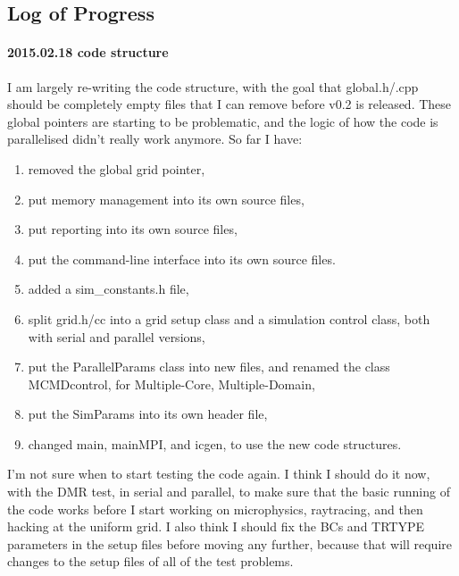 \documentclass[a4paper,11pt]{article}
\begin{document}
\subsection{Log of Progress}

\paragraph{2015.02.18 code structure}
I am largely re-writing the code structure, with the goal that global.h/.cpp should be completely empty files that I can remove before v0.2 is released.
These global pointers are starting to be problematic, and the logic of how the code is parallelised didn't really work anymore.
So far I have:
\begin{enumerate}
\item removed the global grid pointer,
\item put memory management into its own source files, 
\item put reporting into its own source files,
\item put the command-line interface into its own source files.
\item added a sim\_constants.h file,
\item split grid.h/cc into a grid setup class and a simulation control class, both with serial and parallel versions,
\item put the ParallelParams class into new files, and renamed the class MCMDcontrol, for Multiple-Core, Multiple-Domain,
\item put the SimParams into its own header file,
\item changed main, mainMPI, and icgen, to use the new code structures.
\end{enumerate}

I'm not sure when to start testing the code again.
I think I should do it now, with the DMR test, in serial and parallel, to make sure that the basic running of the code works before I start working on microphysics, raytracing, and then hacking at the uniform grid.
I also think I should fix the BCs and TRTYPE parameters in the setup files before moving any further, because that will require changes to the setup files of all of the test problems.
\end{document}
